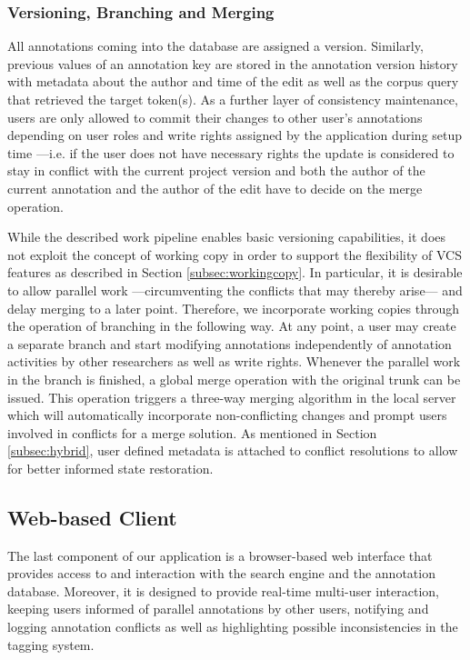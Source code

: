 \documentclass{sig-alternate}
\begin{document}
\subsubsection{Versioning, Branching and Merging}\label{subsec:dbversion}

All annotations coming into the database are assigned a version. Similarly, previous values
of an annotation key are stored in the annotation version history with metadata about the author
and time of the edit as well as the corpus query that retrieved the target token(s).
As a further layer of consistency maintenance, users are only allowed to commit their changes
to other user's annotations depending on user roles and write rights assigned by the application
during setup time ---i.e. if the user does not have necessary rights the update is
considered to stay in conflict with the current project version and both the author of the
current annotation and the author of the edit have to decide on the merge operation.

While the described work pipeline enables basic versioning capabilities, it does not exploit
the concept of working copy in order to support the flexibility of VCS features as described in
Section \ref{subsec:workingcopy}. In particular, it is desirable to allow parallel
work ---circumventing the conflicts that may thereby arise--- and delay merging to a later point. 
Therefore, we incorporate working copies through the operation of branching in the following way.
At any point, a user may create a separate branch and start modifying annotations independently of
annotation activities by other researchers as well as write rights. Whenever the parallel work in
the branch is finished, a global merge operation with the original trunk can be issued.
This operation triggers a three-way merging algorithm in the local server which will
automatically incorporate non-conflicting changes and prompt users involved in conflicts for
a merge solution. As mentioned in Section \ref{subsec:hybrid}, user defined metadata is attached
to conflict resolutions to allow for better informed state restoration.

\subsection{Web-based Client}\label{subsec:client}

The last component of our application is a browser-based web interface that provides access to and
interaction with the search engine and the annotation database. Moreover, it is designed to provide
real-time multi-user interaction, keeping users informed of parallel annotations by other users,
notifying and logging annotation conflicts as well as highlighting possible inconsistencies
in the tagging system.
\end{document}
